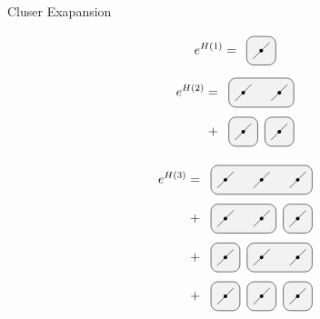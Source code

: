 
\begin{frame}{Cluser Exapansion}

    \begin{minipage}{0.5\textwidth}

         {
            \begin{equation}
                e^{H(1)} =  \vcenter{ \hbox{ \paa  }}
            \end{equation}
            \begin{equation}
                \begin{split}
                    e^{H(2)} =&  \vcenter{ \hbox{ \pa }} \\
                    +&  \vcenter{ \hbox{ \pb }}
                \end{split}
            \end{equation}

        }

         { \clustFullA }
    \end{minipage}
    \begin{minipage}{0.49\textwidth}

         {

            \begin{equation}
                \begin{split}
                    e^{H(3) } =&  \vcenter{ \hbox{ \pcc }} \\
                    +&  \vcenter{ \hbox{ \pca }} \\
                    +&  \vcenter{ \hbox{ \pcb }} \\
                    +&  \vcenter{ \hbox{ \pc }}
                \end{split}
            \end{equation}
        }

         {

}
\end{minipage}
\end{frame}
